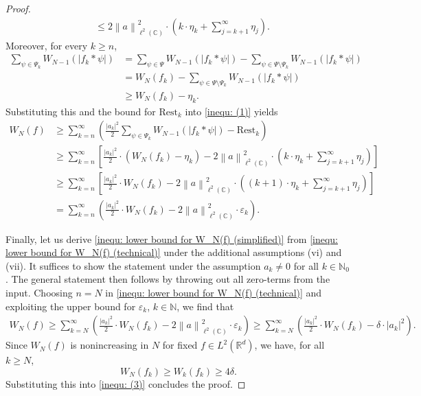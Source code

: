\documentclass[11pt]{amsart}
\newcommand{\R}{{\mathbb{R}}}
\newcommand{\C}{{\mathbb{C}}}
\newcommand{\N}{\mathbb{N}}
\newcommand{\norm}[1]{\ensuremath{\left\lVert\text{}#1\text{}\right\rVert}}
\newenvironment{proof sketch} {\textit{Proof sketch.}}{}
\begin{document}
\begin{proof}
\begin{align*}
      &\leq 2 \norm{a}_{\ell^2(\C)}^2 \cdot \left(k \cdot \eta_k + \sum_{j=k+1}^{\infty} \eta_j\right).
    \end{align*}
    Moreover, for every $k \geq n$,
    \begin{align*}
      \sum_{\psi \in \Psi_k} W_{N-1}(|f_k*\psi|)
      &= \sum_{\psi \in \Psi} W_{N-1}(|f_k*\psi|)- \sum_{\psi \in \Psi \setminus \Psi_k} W_{N-1}(|f_k*\psi|) \\
      &= W_{N}(f_k)-\sum_{\psi \in \Psi \setminus \Psi_k} W_{N-1}(|f_k*\psi|)\\
      &\geq W_{N}(f_k)-\eta_k.
    \end{align*}
    Substituting this and the bound for $\text{Rest}_k$ into \eqref{inequ: (1)} yields
    \begin{align*}
      W_{N}(f)&\geq \sum_{k=n}^\infty \left(\frac{|a_k|^2}{2} \sum_{\psi \in \Psi_k}  W_{N-1}(|f_k*\psi|) - \text{Rest}_k\right) \\
      &\geq \sum_{k=n}^\infty \left[\frac{|a_k|^2}{2} \cdot \left(W_{N}(f_k)-\eta_k\right) - 2 \norm{a}_{\ell^2(\C)}^2 \cdot \left(k\cdot \eta_k + \sum_{j=k+1}^{\infty} \eta_j\right)\right] \\
      &\geq \sum_{k=n}^\infty \left[\frac{|a_k|^2}{2} \cdot W_{N}(f_k) - 2 \norm{a}_{\ell^2(\C)}^2 \cdot \left((k+1) \cdot \eta_k + \sum_{j=k+1}^{\infty} \eta_j\right)\right]\\
      &= \sum_{k=n}^\infty \left(\frac{|a_k|^2}{2}\cdot W_{N}(f_k) - 2 \norm{a}_{\ell^2(\C)}^2 \cdot\varepsilon_k\right).
    \end{align*}
  
    Finally, let us derive \eqref{inequ: lower bound for W_N(f) (simplified)} from \eqref{inequ: lower bound for W_N(f) (technical)} under the additional assumptions (vi) and (vii). It suffices to show the statement under the assumption $a_k\neq 0$ for all $k \in \N_0$. The general statement then follows by throwing out all zero-terms from the input.
    Choosing $n=N$ in \eqref{inequ: lower bound for W_N(f) (technical)} and exploiting the upper bound for $\varepsilon_k$, $k \in \N$, we find that
    \begin{align}\label{inequ: (3)}
      W_N(f)\geq \sum_{k=N}^\infty \left(\frac{|a_k|^2}{2} \cdot W_{N}(f_k) - 2 \norm{a}_{\ell^2(\C)}^2 \cdot \varepsilon_k\right)
      \geq \sum_{k=N}^\infty \left(\frac{|a_k|^2}{2} \cdot W_{N}(f_k) - \delta \cdot |a_k|^2\right).
    \end{align}
    Since $W_N(f)$ is nonincreasing in $N$ for fixed $f \in L^2(\R^d)$, we have, for all $k \geq N$, 
    \[W_N(f_k)\geq W_k(f_k)\geq 4\delta.\] 
    Substituting this into \eqref{inequ: (3)} concludes the proof.
  \end{proof}
  
\end{document}
